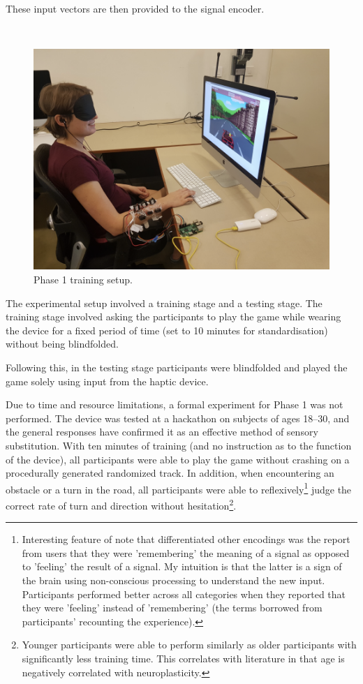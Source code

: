\documentclass[
hidelinks,
12pt, %
oneside, %
english, %
doublespacing, %
headsepline, %
]{MastersDoctoralThesis} %
\begin{document}
\begin{enumerate}
These input vectors are then provided to the signal encoder.

\end{enumerate}

\,

\begin{figure}[h]
\centering\includegraphics[width=0.5\linewidth]{images/gameplay.png}
\decoRule
\caption[P1 experiment]{Phase 1 training setup.}
\label{fig:play}
\end{figure}

The experimental setup involved a training stage and a testing stage. The training stage involved asking the participants to play the game while wearing the device for a fixed period of time (set to 10 minutes for standardisation) without being blindfolded.

Following this, in the testing stage participants were blindfolded and played the game solely using input from the haptic device.

Due to time and resource limitations, a formal experiment for Phase 1 was not performed. The device was tested at a hackathon on subjects of ages 18--30, and the general responses have confirmed it as an effective method of sensory substitution. With ten minutes of training (and no instruction as to the function of the device), all participants were able to play the game without crashing on a procedurally generated randomized track. In addition, when encountering an obstacle or a turn in the road, all participants were able to reflexively\footnote{Interesting feature of note that differentiated other encodings was the report from users that they were 'remembering' the meaning of a signal as opposed to 'feeling' the result of a signal. My intuition is that the latter is a sign of the brain using non-conscious processing to understand the new input. Participants performed better across all categories when they reported that they were 'feeling' instead of 'remembering' (the terms borrowed from participants' recounting the experience).} judge the correct rate of turn and direction without hesitation\footnote{Younger participants were able to perform similarly as older participants with significantly less training time. This correlates with literature \parencite{kolb_brain_2011} in that age is negatively correlated with neuroplasticity.}.
\end{document}
